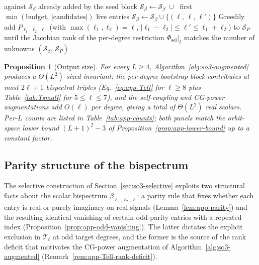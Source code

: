 \documentclass{article}
\newtheorem{proposition}[theorem]{Proposition}
\theoremstyle{definition}
\theoremstyle{remark}
\theoremstyle{definition}
\begin{document}
\begin{algorithm}[t]
\begin{algorithmic}[1]
    against $\mathcal{S}_\beta$ already added by the seed block
  \STATE $\mathcal{S}_\beta \leftarrow \mathcal{S}_\beta
    \;\cup\;$ first $\min(\text{budget},\,
    |\text{candidates}|)$ live entries
  \STATE {}
    \STATE $\mathcal{S}_\beta \leftarrow \mathcal{S}_\beta
      \cup \{(\ell,\, \ell,\, \ell')\}$
  \ENDFOR
  \STATE {}
  \STATE Greedily add $P_{\ell_1,\ell_2,\ell'}$ (with
    $\max(\ell_1,\ell_2) = \ell$, $|\ell_1{-}\ell_2| \le \ell'
    \le \ell_1{+}\ell_2$) to $\mathcal{S}_P$ until the
    Jacobian rank of the per-degree restriction
    $\Phi_{\mathrm{sel}}|_\ell$ matches the number of unknowns
\ENDFOR
\RETURN $(\mathcal{S}_\beta,\, \mathcal{S}_P)$
\end{algorithmic}
\end{algorithm}

\begin{proposition}[Output size]\label{prop:app-output-size}
For every $L\ge 4$, Algorithm~\ref{alg:so3-augmented} produces a
$\Theta(L^2)$-sized invariant: the per-degree bootstrap block
contributes at most $2\ell{+}1$ bispectral triples
(Eq.~\eqref{eq:app-Tell} for $\ell\ge 8$ plus
Table~\ref{tab:Tsmall} for $5\le\ell\le 7$), and the self-coupling
and CG-power augmentations add $O(\ell)$ per degree, giving a total
of $\Theta(L^2)$ real scalars. Per-$L$ counts are listed in
Table~\ref{tab:app-counts}; both panels match the orbit-space
lower bound $(L{+}1)^2-3$ of Proposition~\ref{prop:app-lower-bound}
up to a constant factor.
\end{proposition}



\subsection{Parity structure of the bispectrum}
\label{sec:app-parity}

The selective construction of Section~\ref{sec:so3-selective}
exploits two structural facts about the scalar bispectrum
$\beta_{\ell_1,\ell_2,\ell}$: a parity rule that fixes whether each
entry is real or purely imaginary on real signals (Lemma~\ref{lem:app-parity})
and the resulting identical vanishing of certain odd-parity entries
with a repeated index (Proposition~\ref{prop:app-odd-vanishing}). The
latter dictates the explicit exclusion in $\mathcal{T}_\ell$ at odd
target degrees, and the former is the source of the rank deficit
that motivates the CG-power augmentation of
Algorithm~\ref{alg:so3-augmented} (Remark~\ref{rem:app-Tell-rank-deficit}).
\end{document}
